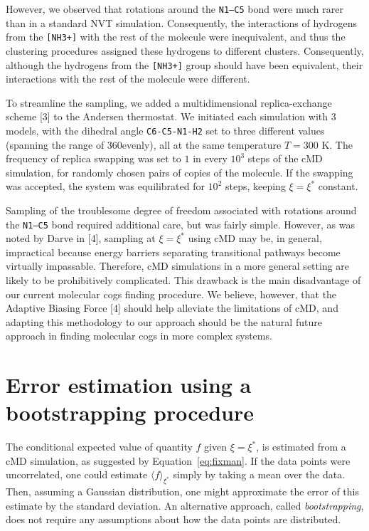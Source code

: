 \documentclass[a4paper,11pt,twoside]{book}%
\begin{document}
\begin{appendices}
However, we observed that rotations around the \texttt{N1--C5} bond were much rarer than in a standard NVT simulation.
Consequently, the interactions of hydrogens from the \texttt{[NH3+]} with the rest of the molecule were inequivalent, and thus the clustering procedures assigned these hydrogens to different clusters.
Consequently, although the hydrogens from the \texttt{[NH3+]} group should have been equivalent, their interactions with the rest of the molecule were different.

To streamline the sampling, we added a multidimensional replica-exchange scheme [3] to the Andersen thermostat.
We initiated each simulation with 3 models, with the dihedral angle \texttt{C6-C5-N1-H2} set to three different values (spanning the range of 360\degree evenly), all at the same temperature $T=300$ K.
The frequency of replica swapping was set to $1$ in every $10^3$ steps of the cMD simulation, for randomly chosen pairs of copies of the molecule.
If the swapping was accepted, the system was equilibrated for $10^2$ steps, keeping $\xi=\xi^*$ constant.

Sampling of the troublesome degree of freedom associated with rotations around the \texttt{N1--C5} bond required additional care, but was fairly simple.
However, as was noted by Darve in [4], sampling at $\xi=\xi^*$ using cMD may be, in general, impractical because energy barriers separating transitional pathways become virtually impassable.
Therefore, cMD simulations in a more general setting are likely to be prohibitively complicated.
This drawback is the main disadvantage of our current molecular cogs finding procedure.
We believe, however, that the Adaptive Biasing Force [4] should help alleviate the limitations of cMD, and adapting this methodology to our approach should be the natural future approach in finding molecular cogs in more complex systems.

\section{Error estimation using a bootstrapping procedure}\label{sec:bootstrapping}
The conditional expected value of quantity $f$ given $\xi=\xi^*$, is estimated from a cMD simulation, {\color{black}as suggested by Equation~\ref{eq:fixman}.}
If the data points were uncorrelated, one could estimate $\langle f \rangle_{\xi^*}$ simply by taking a mean over the data.
Then, assuming a Gaussian distribution, one might approximate the error of this estimate by the standard deviation.
An alternative approach, called \emph{bootstrapping}, does not require any assumptions about how the data points are distributed.


\end{appendices}
\end{document}
